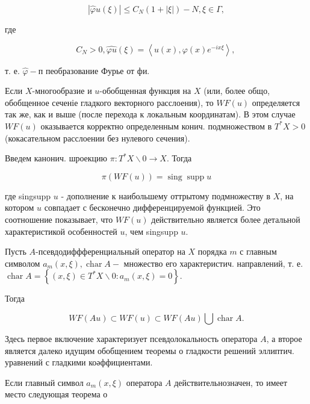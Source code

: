\documentclass[10pt]{article}
\begin{document}
\[

|\widehat{\varphi} u(\xi)| \leqslant C_{N}(1+|\xi|)-N, \xi \in \Gamma,

\]



где



\[

C_{N}>0, \widehat{\varphi u}(\xi)=\left\langle u(x), \varphi(x) e^{-i x \xi}\right\rangle \text {, }

\]



т. е. $\widehat{\varphi}-п$ пеобразование Фурье от фи.



Если $X$-многообразие и $u$-обобщенная функция на $X$ (или, более общо, обобщенное сеченіе гладкого векторного расслоения), то $W F(u)$ определяется так же, как и выше (после перехода к локальным координатам). В этом случае $W F(u)$ оказывается корректно определенным конич. подмножеством в $T^{*} X>0$ (кокасательном расслоении без нулевого сечения).



Введем канонич. шроекцию $\pi: T^{*} X \backslash 0 \longrightarrow X$. Тогда



\[

\pi(W F(u))=\operatorname{sing} \operatorname{supp} u

\]



где singsupp $u$ - дополнение к наибольшему оттрытому подмножеству в $X$, на котором $u$ совпадает с бесконечно дифференцируемой функцией. Это соотношение показывает, что $W F(u)$ действительно является более детальной характеристикой особенностей $u$, чем singsupp $u$.



Пусть $A$-псевдодиффференциальный оператор на $X$ порядка $m$ с главным символом $a_{m}(x, \xi), \operatorname{char} A-$ множество его характеристич. направлений, т. е. $\operatorname{char} A=\left\{(x, \xi) \in T^{*} X \backslash 0: a_{m}(x, \xi)=0\right\}$.



Тогда



\[

W F(A u) \subset W F(u) \subset W F(A u) \bigcup \operatorname{char} A .

\]



Здесь первое включение характеризует псевдолокальность оператора $A$, а второе является далеко идущим обобщением теоремы о гладкости решений эллиптич. уравнений с гладкими коәффициентами.



Если главный символ $a_{m}(x, \xi)$ оператора $A$ действительнозначен, то имеет место следующая теорема о
\end{document}
